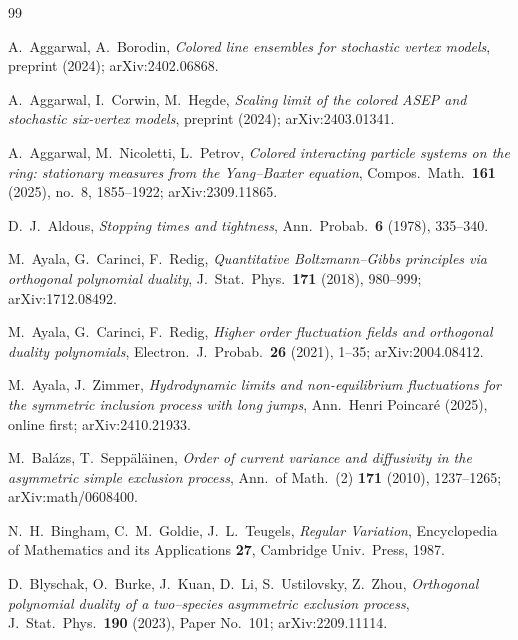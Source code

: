 \documentclass[11pt]{article}
\theoremstyle{plain}
\theoremstyle{definition}
\theoremstyle{remark}
\begin{document}
\begin{thebibliography}{99}

 A.~Aggarwal, A.~Borodin, \emph{Colored line ensembles for
stochastic vertex models}, preprint (2024); arXiv:2402.06868.

 A.~Aggarwal, I.~Corwin, M.~Hegde, \emph{Scaling limit of the colored
ASEP and stochastic six-vertex models}, preprint (2024); arXiv:2403.01341.

 A.~Aggarwal, M.~Nicoletti, L.~Petrov, \emph{Colored interacting
particle systems on the ring: stationary measures from the Yang--Baxter equation},
Compos.~Math.~\textbf{161} (2025), no.~8, 1855--1922; arXiv:2309.11865.

 D.~J.~Aldous, \emph{Stopping times and tightness},
Ann.~Probab.~\textbf{6} (1978), 335--340.

 M.~Ayala, G.~Carinci, F.~Redig, \emph{Quantitative Boltzmann--Gibbs
principles via orthogonal polynomial duality}, J.~Stat.~Phys.~\textbf{171} (2018),
980--999; arXiv:1712.08492.

 M.~Ayala, G.~Carinci, F.~Redig, \emph{Higher order fluctuation fields and
orthogonal duality polynomials}, Electron.~J.~Probab.~\textbf{26} (2021), 1--35;
arXiv:2004.08412.

 M.~Ayala, J.~Zimmer, \emph{Hydrodynamic limits and
non-equilibrium fluctuations for the symmetric inclusion process with long jumps},
Ann.~Henri Poincar\'e (2025), online first; arXiv:2410.21933.

 M.~Bal\'azs, T.~Sepp\"al\"ainen, \emph{Order of current
variance and diffusivity in the asymmetric simple exclusion process}, Ann.~of
Math.~(2) \textbf{171} (2010), 1237--1265; arXiv:math/0608400.

 N.~H.~Bingham, C.~M.~Goldie, J.~L.~Teugels, \emph{Regular Variation},
Encyclopedia of Mathematics and its Applications \textbf{27}, Cambridge Univ.\ Press,
1987.

 D.~Blyschak, O.~Burke, J.~Kuan, D.~Li, S.~Ustilovsky, Z.~Zhou,
\emph{Orthogonal polynomial duality of a two--species asymmetric exclusion process},
J.~Stat.~Phys.~\textbf{190} (2023), Paper No.~101; arXiv:2209.11114.


\end{thebibliography}
\end{document}
